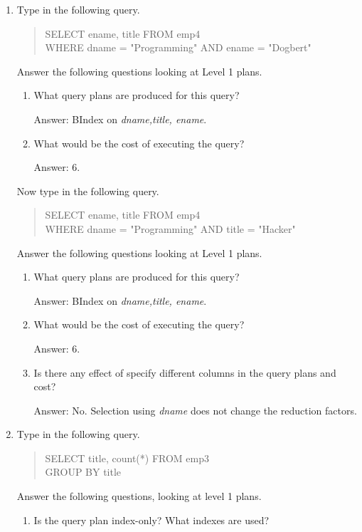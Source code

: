 \begin{enumerate}
\item
Type in the following query.
\begin{quote}
        SELECT ename, title FROM emp4\\
        WHERE dname = "Programming" AND ename = "Dogbert"
\end{quote}

Answer the following questions looking at Level 1 plans.
\begin{enumerate}
\item
What query plans are produced for this query?

Answer: BIndex on {\em dname,title, ename}.

\item
What would be the cost of executing the query?

Answer: 6.

\end{enumerate}

Now type in the following query.
\begin{quote}
        SELECT ename, title FROM emp4\\
        WHERE dname = "Programming" AND title = "Hacker"
\end{quote}

Answer the following questions looking at Level 1 plans.
\begin{enumerate}
\item
What query plans are produced for this query?

Answer: BIndex on {\em dname,title, ename}.

\item
What would be the cost of executing the query?

Answer: 6.

\item
Is there any effect of specify different columns in the query plans
and cost?

Answer: No.  Selection using {\em dname} does not change the reduction
factors.
\end{enumerate}


\item
Type in the following query.
\begin{quote}
        SELECT title, count(*) FROM emp3\\
        GROUP BY title
\end{quote}

Answer the following questions, looking at level 1 plans.
\begin{enumerate}
\item
Is the query plan index-only?  What indexes are used?


\end{enumerate}
\end{enumerate}
